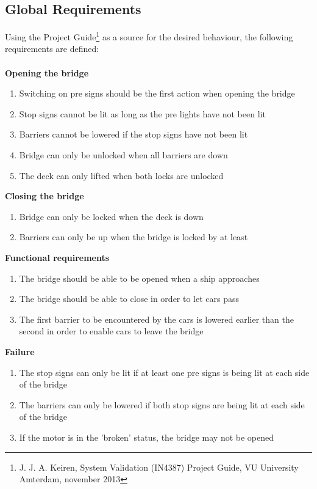 \documentclass{article}
\begin{document}
\subsection{Global Requirements}
\label{sec:glob}

Using the Project Guide\footnote{J. J. A. Keiren, System Validation (IN4387) Project Guide, VU University Amterdam, november 2013} as a source for the desired behaviour, the following requirements are defined:
\\
\\
\textbf{Opening the bridge}
	\begin{enumerate}
  	\item Switching on pre signs should be the first action when opening the bridge
		\item Stop signs cannot be lit as long as the pre lights have not been lit
		\item Barriers cannot be lowered if the stop signs have not been lit
		\item Bridge can only be unlocked when all barriers are down
		\item The deck can only lifted when both locks are unlocked
   \setcounter{enumTemp}{\theenumi}
 \end{enumerate}
  
\textbf{Closing the bridge}
  \begin{enumerate}
    \setcounter{enumi}{\theenumTemp}
  	\item Bridge can only be locked when the deck is down
		\item Barriers can only be up when the bridge is locked by at least 
		\setcounter{enumTemp}{\theenumi}
  \end{enumerate}
 
\textbf{Functional requirements}
	\begin{enumerate}
	
			\item The bridge should be able to be opened when a ship approaches
			\item The bridge should be able to close in order to let cars pass
			\item The first barrier to be encountered by the cars is lowered earlier than the second in order to enable cars to leave the bridge
		\setcounter{enumTemp}{\theenumi}
	\end{enumerate}

\textbf{Failure}
	\begin{enumerate}
		\setcounter{enumi}{\theenumTemp}
			\item The stop signs can only be lit if at least one pre signs is being lit at each side of the bridge
			\item The barriers can only be lowered if both stop signs are being lit at each side of the bridge
			\item If the motor is in the 'broken' status, the bridge may not be opened
		\setcounter{enumTemp}{\theenumi}
	\end{enumerate}
\end{document}
